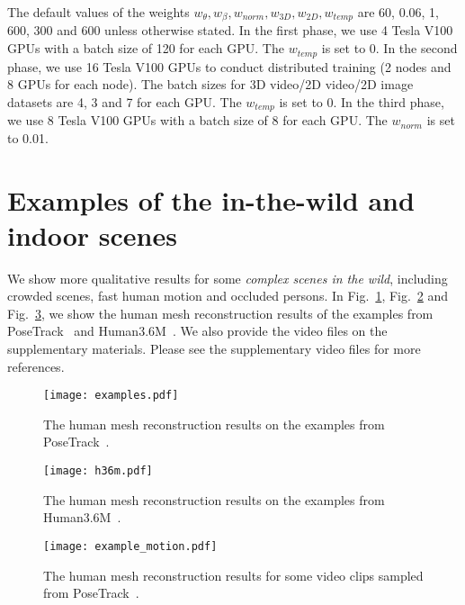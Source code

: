 \documentclass{article}
\begin{document}
The default values of the weights $w_{\theta}, w_{\beta}, w_{norm}, w_{3D}, w_{2D}, w_{temp}$ are 60, 0.06, 1, 600, 300 and 600 unless otherwise stated.
In the first phase, we use 4 Tesla V100 GPUs with a batch size of 120 for each GPU.  The $w_{temp}$ is set to 0.
In the second phase, we use 16 Tesla V100 GPUs to conduct distributed training (2 nodes and 8 GPUs for each node). The batch sizes for 3D video/2D video/2D image datasets are 4, 3 and 7 for each GPU. The $w_{temp}$ is set to 0.
In the third phase, we use 8 Tesla V100 GPUs with a batch size of 8 for each GPU. The $w_{norm}$ is set to 0.01.


\section{Examples of the in-the-wild and indoor scenes}

We show more qualitative results for some \textit{complex scenes in the wild}, including crowded scenes, fast human motion and occluded persons. In Fig.~\ref{fig:examples}, Fig.~\ref{fig:h36m} and Fig.~\ref{fig:example_motion}, we show the human mesh reconstruction results of the examples from PoseTrack~\cite{posetrack:andriluka2018posetrack} and Human3.6M~\cite{h36m:ionescu2013human3}. We also provide the video files on the supplementary materials. Please see the supplementary video files for more references. %


\begin{figure}[t]
	\centering
	\texttt{[image: examples.pdf]}
	\caption{The human mesh reconstruction results on the examples from PoseTrack~\cite{posetrack:andriluka2018posetrack}.}
	\label{fig:examples}
\end{figure}



\begin{figure}[t]
	\centering
	\texttt{[image: h36m.pdf]}
	\caption{The human mesh reconstruction results on the examples from Human3.6M~\cite{h36m:ionescu2013human3}.}
	\label{fig:h36m}
\end{figure}

\begin{figure}[t]
	\centering
	\texttt{[image: example\_motion.pdf]}
	\caption{The human mesh reconstruction results for some video clips sampled from PoseTrack~\cite{posetrack:andriluka2018posetrack}.}
	\label{fig:example_motion}
\end{figure}
\end{document}
